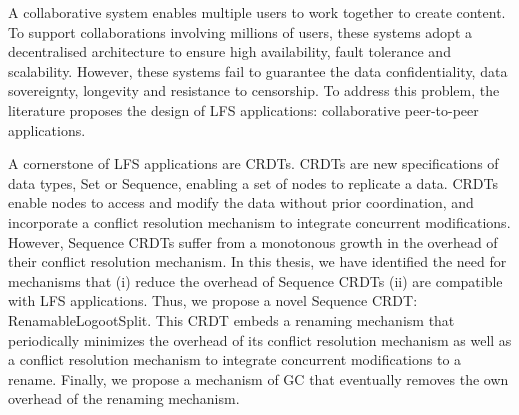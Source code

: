 \begin{ThesisAbstract}
\begin{FrenchAbstract}
    \end{FrenchAbstract}
    \begin{EnglishAbstract}
        A collaborative system enables multiple users to work together to create content.
        To support collaborations involving millions of users, these systems adopt a decentralised architecture to ensure high availability, fault tolerance and scalability.
        However, these systems fail to guarantee the data confidentiality, data sovereignty, longevity and resistance to censorship.
        To address this problem, the literature proposes the design of \acf{LFS} applications: collaborative peer-to-peer applications.

        A cornerstone of LFS applications are \acfp{CRDT}.
        \acp{CRDT} are new specifications of data types, \eg Set or Sequence, enabling a set of nodes to replicate a data.
        \acp{CRDT} enable nodes to access and modify the data without prior coordination, and incorporate a conflict resolution mechanism to integrate concurrent modifications.
        However, Sequence \acp{CRDT} suffer from a monotonous growth in the overhead of their conflict resolution mechanism.
        In this thesis, we have identified the need for mechanisms that (i) reduce the overhead of Sequence \acp{CRDT} (ii) are compatible with \ac{LFS} applications.
        Thus, we propose a novel Sequence \ac{CRDT}: RenamableLogootSplit.
        This \ac{CRDT} embeds a renaming mechanism that periodically minimizes the overhead of its conflict resolution mechanism as well as a conflict resolution mechanism to integrate concurrent modifications to a rename.
        Finally, we propose a mechanism of \acf{GC} that eventually removes the own overhead of the renaming mechanism.
    \end{EnglishAbstract}
\end{ThesisAbstract}
